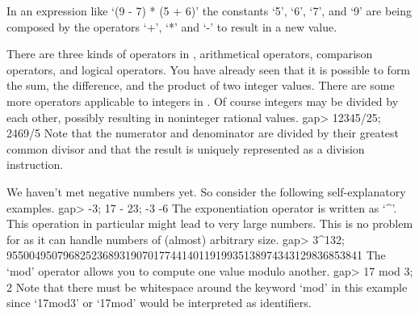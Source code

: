 \null

%
In an  expression like `(9  - 7) * (5 +  6)' the constants `5', `6', `7',
and `9' are being composed by the operators `+', `*' and `-' to result in
a new value.

There are  three kinds  of operators in  {\GAP}, arithmetical  operators,
comparison operators, and logical operators.  You  have already seen that
it is possible to form  the sum,  the  difference, and the product of two
integer values.  There are some  more operators applicable to integers in
{\GAP}.   Of  course integers  may  be divided  by  each other,  possibly
resulting in noninteger rational values.
\beginexample
    gap> 12345/25;
    2469/5 
\endexample
Note  that  the numerator and denominator  are divided by their  greatest
common divisor  and that the result is uniquely represented as a division
instruction.

We     haven't met negative numbers      yet.  So consider the  following
self-explanatory examples.
\beginexample
    gap> -3; 17 - 23;
    -3
    -6 
\endexample
The exponentiation   operator  is  written  as  `^'. This   operation  in
particular might lead  to  very large numbers.  This  is  no problem  for
{\GAP} as it can handle numbers of (almost) arbitrary size.
\beginexample
    gap> 3^132;
    955004950796825236893190701774414011919935138974343129836853841 
\endexample
The `mod' operator allows you to compute one value modulo another.
\beginexample
    gap> 17 mod 3;
    2 
\endexample
Note  that  there must be   whitespace around the  keyword  `mod' in this
example since `17mod3' or `17mod' would be interpreted as identifiers.

